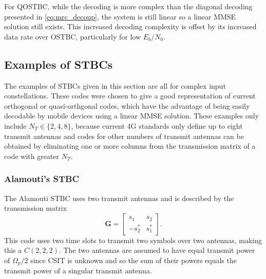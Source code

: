 For QOSTBC, while the decoding is more complex than the diagonal decoding presented in \eqref{eq:mrc_decoup}, the system is still linear so a linear MMSE solution still exists. This increased decoding complexity is offset by its increased data rate over OSTBC, particularly for low $E_b/N_0$.

\subsection{Examples of STBCs}
The examples of STBCs given in this section are all for complex input constellations. These codes were chosen to give a good representation of current orthogonal or quasi-orthgonal codes, which have the advantage of being easily decodable by mobile devices using a linear MMSE solution. These examples only include $N_T\in\{2,4,8\}$, because current 4G standards only define up to eight transmit antennas and codes for other numbers of transmit antennas can be obtained by eliminating one or more columns from the transmission matrix of a code with greater $N_T$.

\subsubsection{Alamouti's STBC}
The Alamouti STBC uses two transmit antennas and is described by the transmission matrix
\[ \bm{G} = \begin{bmatrix} s_1 & s_2 \\ -s_2^\ast & s_1^\ast \end{bmatrix} . \]
This code uses two time slots to transmit two symbols over two antennas, making this a $C(2,2,2)$. The two antennas are assumed to have equal transmit power of $\Omega_p/2$ since CSIT is unknown and so the sum of their powers equals the transmit power of a singular transmit antenna.

